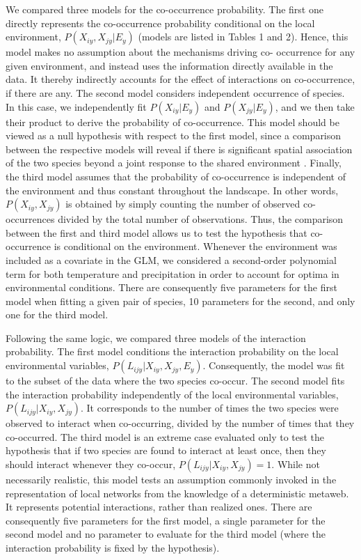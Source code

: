 \documentclass[12pt]{article}
\begin{document}
We compared three models for the co-occurrence probability. The first one
directly represents the co-occurrence probability conditional on the local
environment, $P(X_{iy},X_{jy}|E_y)$ (models are listed in Tables 1 and 2).
Hence, this model makes no assumption about the mechanisms driving co-
occurrence for any given environment, and instead uses the information
directly available in the data. It thereby indirectly accounts for the effect
of interactions on co-occurrence, if there are any. The second model considers
independent occurrence of species. In this case, we independently fit
$P(X_{iy} |E_y)$ and $P(X_{jy} |E_y)$, and we then take their product to
derive the probability of co-occurrence. This model should be viewed as a null
hypothesis with respect to the first model, since a comparison between the
respective models will reveal if there is significant spatial association of
the two species beyond a joint response to the shared environment
\citep{Cazelles2016}. Finally, the third model assumes that the probability of
co-occurrence is independent of the environment and thus constant throughout
the landscape. In other words, $P(X_{iy},X_{jy})$ is obtained by simply
counting the number of observed co-occurrences divided by the total number of
observations. Thus, the comparison between the first and third model allows us
to test the hypothesis that co-occurrence is conditional on the environment.
Whenever the environment was included as a covariate in the GLM, we considered
a second-order polynomial term for both temperature and precipitation in
order to account for optima in environmental conditions. There are
consequently five parameters for the first model when fitting a given pair of
species, 10 parameters for the second, and only one for the third model.

Following the same logic, we compared three models of the interaction
probability. The first model conditions the interaction probability on the
local environmental variables, $P(L_{ijy}|X_{iy},X_{jy},E_y)$. Consequently,
the model was fit to the subset of the data where the two species co-occur.
The second model fits the interaction probability independently of the local
environmental variables, $P(L_{ijy}|X_{iy},X_{jy})$. It corresponds to the
number of times the two species were observed to interact when co-occurring,
divided by the number of times that they co-occurred. The third model is an
extreme case evaluated only to test the hypothesis that if two species are
found to interact at least once, then they should interact whenever they co-occur, $P(L_{ijy}|X_{iy},X_{jy})=1$. While not necessarily realistic, this
model tests an assumption commonly invoked in the representation of local
networks from the knowledge of a deterministic metaweb. It represents
potential interactions, rather than realized ones. There are consequently five
parameters for the first model, a single parameter for the second model and no
parameter to evaluate for the third model (where the interaction probability
is fixed by the hypothesis).
\end{document}
